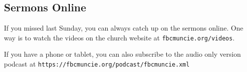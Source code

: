 \vspace{\fill}

\subsection{Sermons Online}
\label{timeofresponse}

If you missed last Sunday, you can always catch up on the sermons online. One way is to watch the videos on the church website at \texttt{fbcmuncie.org/videos}.

If you have a phone or tablet, you can also subscribe to the audio only version podcast at \texttt{https://fbcmuncie.org/podcast/fbcmuncie.xml}

\vspace{\fill}
